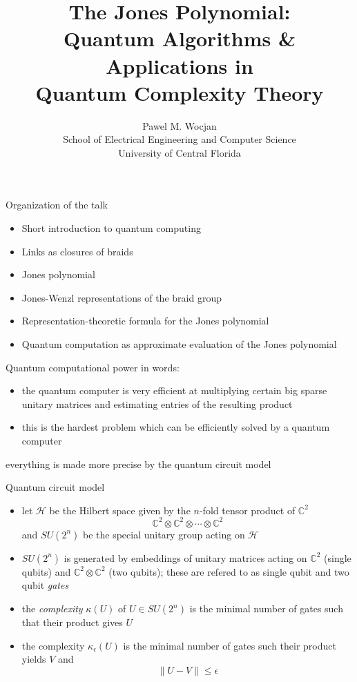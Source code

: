 \documentclass{prosper}
\title{The Jones Polynomial:\\ Quantum Algorithms \& Applications in\\ Quantum Complexity Theory}
\author{Pawel M. Wocjan\\[1ex]School of Electrical Engineering and Computer Science\\ University of Central Florida}
\renewcommand{\>}{\rangle}
\newcommand{\<}{\langle}
\begin{document}
\maketitle

\begin{slide}{Organization of the talk}
\begin{itemize}
\item Short introduction to quantum computing
\item Links as closures of braids
\item Jones polynomial
\item Jones-Wenzl representations of the braid group
\item Representation-theoretic formula for the Jones polynomial
\item Quantum computation as approximate evaluation of the Jones polynomial
\end{itemize}
\end{slide}


\begin{slide}{Quantum computational power}
in words:
\begin{itemize}
\item the quantum computer is very efficient at multiplying certain big sparse unitary matrices and estimating entries of the resulting product
\item this is the hardest problem which can be efficiently solved by a quantum computer
\end{itemize}

\bigskip
everything is made more precise by the quantum circuit model
\end{slide}

\begin{slide}{Quantum circuit model}
\begin{itemize}
\item let $\mathcal{H}$ be the Hilbert space given by the $n$-fold tensor product of $\mathbb{C}^2$ 
\[
\mathbb{C}^2\otimes\mathbb{C}^2\otimes\cdots\otimes\mathbb{C}^2
\]
and $SU(2^n)$ be the special unitary group acting on $\mathcal{H}$
\item $SU(2^n)$ is generated by embeddings of unitary matrices acting on $\mathbb{C}^2$ (single qubits) and $\mathbb{C}^2\otimes\mathbb{C}^2$ (two qubits); these are refered to as single qubit and two qubit \emph{gates}
\item the \emph{complexity} $\kappa(U)$ of $U\in SU(2^n)$ is the minimal number of gates such that their product gives $U$
\item the complexity $\kappa_\epsilon(U)$ is the minimal number of gates such their product yields $V$ and 
\[
\| U - V \| \le \epsilon
\]
\end{itemize}

\end{slide}
\end{document}
